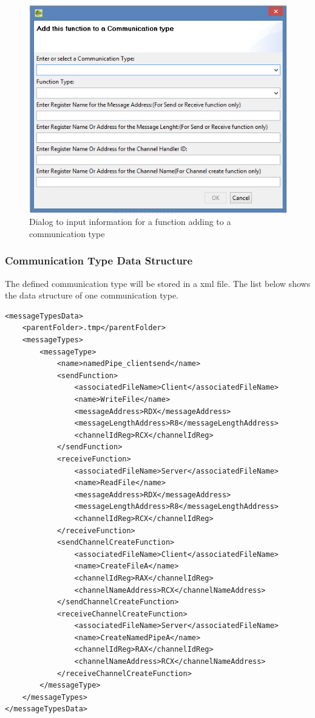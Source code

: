 \begin{figure}[h]
\includegraphics{Figures/dialog}
 \caption{Dialog to input information for a function adding to a communication type}
\label{dialog}
\end{figure}

\subsubsection{Communication Type Data Structure}
The defined communication type will be stored in a xml file. The list below shows the data structure of one communication type. 
\begin{lstlisting}
<messageTypesData>
    <parentFolder>.tmp</parentFolder>
    <messageTypes>
        <messageType>
            <name>namedPipe_clientsend</name>
            <sendFunction>
                <associatedFileName>Client</associatedFileName>
                <name>WriteFile</name>
                <messageAddress>RDX</messageAddress>
                <messageLengthAddress>R8</messageLengthAddress>
                <channelIdReg>RCX</channelIdReg>
            </sendFunction>
            <receiveFunction>
                <associatedFileName>Server</associatedFileName>
                <name>ReadFile</name>
                <messageAddress>RDX</messageAddress>
                <messageLengthAddress>R8</messageLengthAddress>
                <channelIdReg>RCX</channelIdReg>
            </receiveFunction>
            <sendChannelCreateFunction>
                <associatedFileName>Client</associatedFileName>
                <name>CreateFileA</name>
                <channelIdReg>RAX</channelIdReg>
                <channelNameAddress>RCX</channelNameAddress>
            </sendChannelCreateFunction>
            <receiveChannelCreateFunction>
                <associatedFileName>Server</associatedFileName>
                <name>CreateNamedPipeA</name>
                <channelIdReg>RAX</channelIdReg>
                <channelNameAddress>RCX</channelNameAddress>
            </receiveChannelCreateFunction>
        </messageType>
    </messageTypes>
</messageTypesData>
\end{lstlisting}


